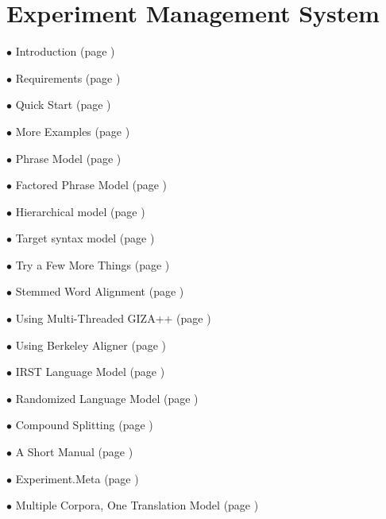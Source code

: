 


\label{experiment-perl.tex}

\section{
Experiment Management System}






      {\bf $\bullet$} Introduction (page \pageref{experiment-perl.texntoc1}) 

      {\bf $\bullet$} Requirements (page \pageref{experiment-perl.texntoc2}) 

      {\bf $\bullet$} Quick Start (page \pageref{experiment-perl.texntoc3}) 

      {\bf $\bullet$} More Examples (page \pageref{experiment-perl.texntoc4}) 

      {\bf $\bullet$} Phrase Model (page \pageref{experiment-perl.texntoc5}) 

      {\bf $\bullet$} Factored Phrase Model (page \pageref{experiment-perl.texntoc6}) 

      {\bf $\bullet$} Hierarchical model (page \pageref{experiment-perl.texntoc7}) 

      {\bf $\bullet$} Target syntax model (page \pageref{experiment-perl.texntoc8}) 

      {\bf $\bullet$} Try a Few More Things (page \pageref{experiment-perl.texntoc9}) 

      {\bf $\bullet$} Stemmed Word Alignment (page \pageref{experiment-perl.texntoc10}) 

      {\bf $\bullet$} Using Multi-Threaded GIZA++ (page \pageref{experiment-perl.texntoc11}) 

      {\bf $\bullet$} Using Berkeley Aligner (page \pageref{experiment-perl.texntoc12}) 

      {\bf $\bullet$} IRST Language Model (page \pageref{experiment-perl.texntoc13}) 

      {\bf $\bullet$} Randomized Language Model (page \pageref{experiment-perl.texntoc14}) 

      {\bf $\bullet$} Compound Splitting (page \pageref{experiment-perl.texntoc15}) 

      {\bf $\bullet$} A Short Manual (page \pageref{experiment-perl.texntoc16}) 

      {\bf $\bullet$} Experiment.Meta (page \pageref{experiment-perl.texntoc17}) 

      {\bf $\bullet$} Multiple Corpora, One Translation Model (page \pageref{experiment-perl.texntoc18}) 

